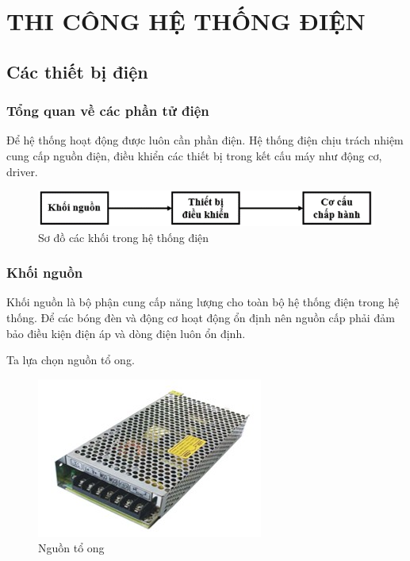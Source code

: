 \chapter{THI CÔNG HỆ THỐNG ĐIỆN}
\section{Các thiết bị điện}

\subsection{Tổng quan về các phần tử điện}
Để hệ thống hoạt động được luôn cần phần điện. Hệ thống điện chịu trách nhiệm cung cấp nguồn điện, điều khiển các thiết bị trong kết cấu máy như động cơ, driver.
\begin{center}
	\begin{figure}[ht]
	\begin{center}
		\includegraphics[scale=1]{Chapters/Chapter4/Images/Sodokhoidien}
	\end{center}
	\caption{Sơ đồ các khối trong hệ thống điện}
	\label{fig:sodokhoidien}
	\end{figure}
\end{center}

\subsection{Khối nguồn}
Khối nguồn là bộ phận cung cấp năng lượng cho toàn bộ hệ thống điện trong hệ thống. Để các bóng đèn và động cơ hoạt động ổn định nên nguồn cấp phải đảm bảo điều kiện điện áp và dòng điện luôn ổn định.

Ta lựa chọn nguồn tổ ong.
\begin{figure}[htp]
	\centering
	\includegraphics[scale=1]{Chapters/Chapter4/Images/Nguontoong}
	\caption{Nguồn tổ ong}
	\label{fig:Nguontoong}
\end{figure}

